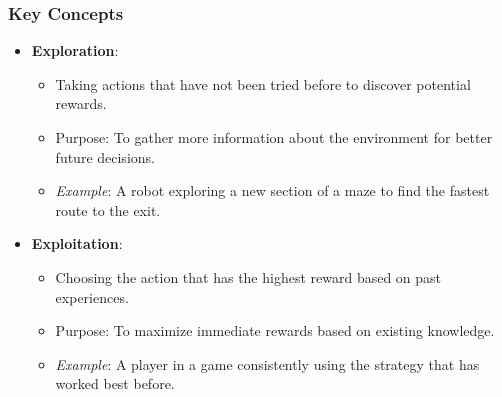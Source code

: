 \documentclass[aspectratio=169]{beamer}
\begin{document}
\begin{frame}[fragile]
    \frametitle{Key Concepts}
    \begin{itemize}
        \item \textbf{Exploration}:
        \begin{itemize}
            \item Taking actions that have not been tried before to discover potential rewards.
            \item Purpose: To gather more information about the environment for better future decisions.
            \item \textit{Example}: A robot exploring a new section of a maze to find the fastest route to the exit.
        \end{itemize}
        
        \item \textbf{Exploitation}:
        \begin{itemize}
            \item Choosing the action that has the highest reward based on past experiences.
            \item Purpose: To maximize immediate rewards based on existing knowledge.
            \item \textit{Example}: A player in a game consistently using the strategy that has worked best before.
        \end{itemize}
    \end{itemize}
\end{frame}
\end{document}
